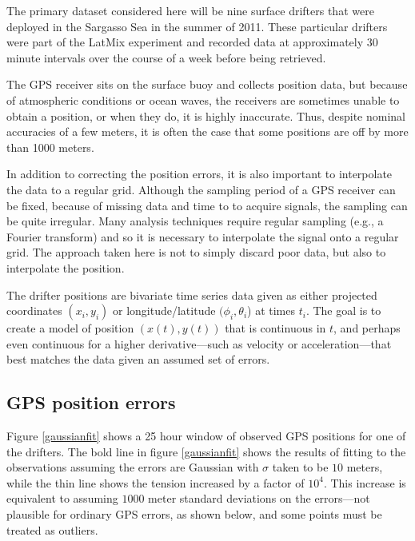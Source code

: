 \documentclass[10pt,journal]{IEEEtran}
\begin{document}
The primary dataset considered here will be nine surface drifters that were deployed in the Sargasso Sea in the summer of 2011. These particular drifters were part of the LatMix experiment \cite{shcherbina2015-bams} and recorded data at approximately 30 minute intervals over the course of a week before being retrieved.

The GPS receiver sits on the surface buoy and collects position data, but because of atmospheric conditions or ocean waves, the receivers are sometimes unable to obtain a position, or when they do, it is highly inaccurate. Thus, despite nominal accuracies of a few meters, it is often the case that some positions are off by more than 1000 meters.

In addition to correcting the position errors, it is also important to interpolate the data to a regular grid. Although the sampling period of a GPS receiver can be fixed, because of missing data and time to to acquire signals, the sampling can be quite irregular.  Many analysis techniques require regular sampling (e.g., a Fourier transform) and so it is necessary to interpolate the signal onto a regular grid. The approach taken here is not to simply discard poor data, but also to interpolate the position.



The drifter positions are bivariate time series data given as either projected coordinates $(x_i, y_i)$ or longitude/latitude $(\phi_i, \theta_i$) at times $t_i$. The goal is to create a model of position $(x(t),y(t))$ that is continuous in $t$, and perhaps even continuous for a higher derivative---such as velocity or acceleration---that best matches the data given an assumed set of errors.
\subsection{GPS position errors}
\label{gps_position_errors}

Figure \ref{gaussianfit} shows a 25 hour window of observed GPS positions for one of the drifters. The bold line in figure \ref{gaussianfit} shows the results of fitting to the observations assuming the errors are Gaussian with $\sigma$ taken to be $10$ meters, while the thin line shows the tension increased by a factor of $10^4$. This increase is equivalent to assuming $1000$ meter standard deviations on the errors---not plausible for ordinary GPS errors, as shown below, and some points must be treated as outliers. 
\end{document}
